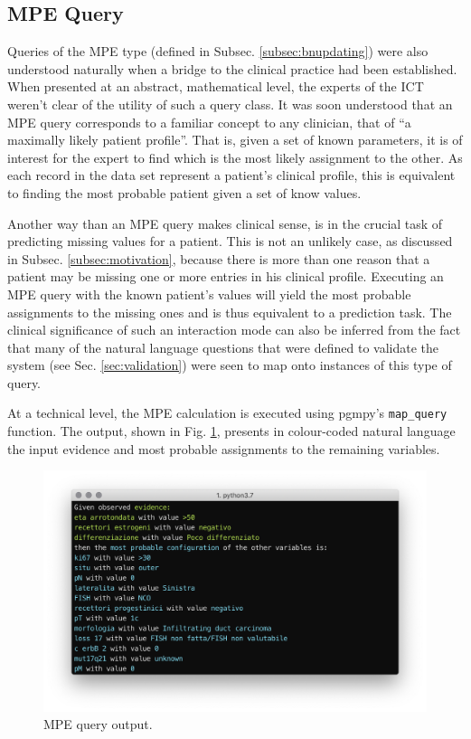 \subsection{MPE Query}
Queries of the MPE type (defined in Subsec. \ref{subsec:bnupdating}) were also understood naturally when a bridge to the clinical practice had been established.
When presented at an abstract, mathematical level, the experts of the ICT weren't clear of the utility of such a query class.
It was soon understood that an MPE query corresponds to a familiar concept to any clinician, that of \enquote{a maximally likely patient profile}.
That is, given a set of known parameters, it is of interest for the expert to find which is the most likely assignment to the other.
As each record in the data set represent a patient's clinical profile, this is equivalent to finding the most probable patient given a set of know values.

Another way than an MPE query makes clinical sense, is in the crucial task of predicting missing values for a patient.
This is not an unlikely case, as discussed in Subsec. \ref{subsec:motivation}, because there is more than one reason that a patient may be missing one or more entries in his clinical profile.
Executing an MPE query with the known patient's values will yield the most probable assignments to the missing ones and is thus equivalent to a prediction task.
The clinical significance of such an interaction mode can also be inferred from the fact that many of the natural language questions that were defined to validate the system (see Sec. \ref{sec:validation}) were seen to map onto instances of this type of query.

At a technical level, the MPE calculation is executed using pgmpy's \texttt{map\_query} function. 
The output, shown in Fig. \ref{fig:sw_4_mpe}, presents in colour-coded natural language the input evidence and most probable assignments to the remaining variables.

\begin{figure}[htbp]
\centerline{\includegraphics[width=\columnwidth]{results/images/sw_4_mpe}}
\caption{MPE query output.}
\label{fig:sw_4_mpe}
\end{figure}


